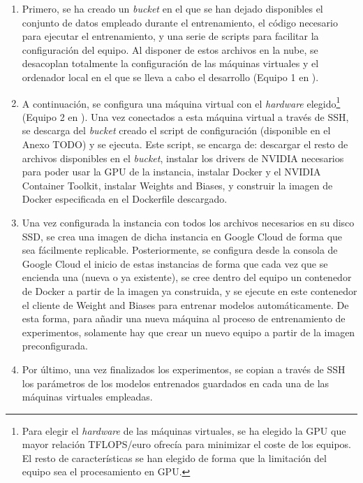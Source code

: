 \begin{enumerate}
\item Primero, se ha creado un \textit{bucket} en el que se han dejado disponibles el conjunto de datos empleado durante el entrenamiento, el código necesario para ejecutar el entrenamiento, y una serie de scripts para facilitar la configuración del equipo. Al disponer de estos archivos en la nube, se desacoplan totalmente la configuración de las máquinas virtuales y el ordenador local en el que se lleva a cabo el desarrollo (Equipo 1 en ).
\item A continuación, se configura una máquina virtual con el \textit{hardware} elegido\footnote{Para elegir el \textit{hardware} de las máquinas virtuales, se ha elegido la GPU que mayor relación TFLOPS/euro ofrecía para minimizar el coste de los equipos. El resto de características se han elegido de forma que la limitación del equipo sea el procesamiento en GPU.} (Equipo 2 en ). Una vez conectados a esta máquina virtual a través de SSH, se descarga del \textit{bucket} creado el script de configuración (disponible en el Anexo TODO) y se ejecuta. Este script, se encarga de: descargar el resto de archivos disponibles en el \textit{bucket}, instalar los drivers de NVIDIA necesarios para poder usar la GPU de la instancia, instalar Docker y el NVIDIA Container Toolkit, instalar Weights and Biases, y construir la imagen de Docker especificada en el Dockerfile descargado.
\item Una vez configurada la instancia con todos los archivos necesarios en su disco SSD, se crea una imagen de dicha instancia en Google Cloud de forma que sea fácilmente replicable. Posteriormente, se configura desde la consola de Google Cloud el inicio de estas instancias de forma que cada vez que se encienda una (nueva o ya existente), se cree dentro del equipo un contenedor de Docker a partir de la imagen ya construida, y se ejecute en este contenedor el cliente de Weight and Biases para entrenar modelos automáticamente. De esta forma, para añadir una nueva máquina al proceso de entrenamiento de experimentos, solamente hay que crear un nuevo equipo a partir de la imagen preconfigurada.
\item Por último, una vez finalizados los experimentos, se copian a través de SSH los parámetros de los modelos entrenados guardados en cada una de las máquinas virtuales empleadas.
\end{enumerate}

